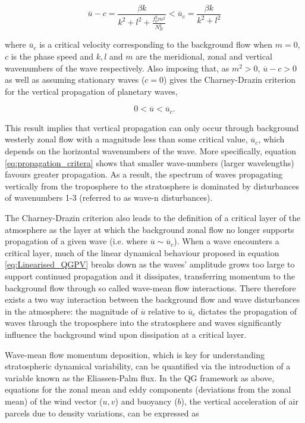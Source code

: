 \begin{equation} \label{eq:propagation_critera}
\overline{u} - c = \frac{\beta k}{k^2 + l^2 + \frac{f_0^2 m^2}{N_B^2}} < \overline{u}_c = \frac{\beta k}{k^2 + l^2}
\end{equation}

\noindent where $\overline{u}_c$ is a critical velocity corresponding to the background flow when $m = 0$, $c$ is the phase speed and $k, l$ and $m$ are the meridional, zonal and vertical wavenumbers of the wave respectively. Also imposing that, as $m^2 > 0$, $\overline{u} - c > 0$ as well as assuming stationary waves ($c = 0$) gives the Charney-Drazin criterion for the vertical propagation of planetary waves,

\begin{equation} \label{eq:Charney-Drazin}
0 < \overline{u} < \overline{u}_c.
\end{equation}

This result implies that vertical propagation can only occur through background westerly zonal flow with a magnitude less than some critical value, $\overline{u}_c$, which depends on the horizontal wavenumbers of the wave. More specifically, equation \ref{eq:propagation_critera} shows that smaller wave-numbers (larger wavelengths) favours greater propagation. As a result, the spectrum of waves propagating vertically from the troposphere to the stratosphere is dominated by disturbances of wavenumbers 1-3 (referred to as wave-n disturbances).  

The Charney-Drazin criterion also leads to the definition of a critical layer of the atmosphere as the layer at which the background zonal flow no longer supports propagation of a given wave (i.e. where $\overline{u} \sim \overline{u}_c$). When a wave encounters a critical layer, much of the linear dynamical behaviour proposed in equation \ref{eq:Linearised_QGPV} breaks down as the waves' amplitude grows too large to support continued propagation and it dissipates, transferring momentum to the background flow through so called wave-mean flow interactions. There therefore exists a two way interaction between the background flow and wave disturbances in the atmosphere: the magnitude of $\overline{u}$ relative to $\overline{u}_c$ dictates the propagation of waves through the troposphere into the stratosphere and waves significantly influence the background wind upon dissipation at a critical layer.

Wave-mean flow momentum deposition, which is key for understanding stratospheric dynamical variability, can be quantified via the introduction of a variable known as the Eliassen-Palm flux. In the QG framework as above, equations for the zonal mean and eddy components (deviations from the zonal mean) of the wind vector ($u, v$) and buoyancy ($b$), the vertical acceleration of air parcels due to density variations, can be expressed as 

